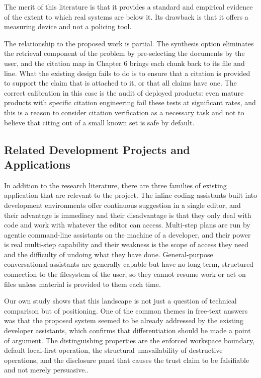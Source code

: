 \documentclass{FastFyp}
\begin{document}
The merit of this literature is that it provides a standard and empirical evidence of the extent to which real systems are below it. Its drawback is that it offers a measuring device and not a policing tool.

The relationship to the proposed work is partial. The synthesis option eliminates the retrieval component of the problem by pre-selecting the documents by the user, and the citation map in Chapter 6 brings each chunk back to its file and line. What the existing design fails to do is to ensure that a citation is provided to support the claim that is attached to it, or that all claims have one. The correct calibration in this case is the audit of deployed products: even mature products with specific citation engineering fail these tests at significant rates, and this is a reason to consider citation verification as a necessary task and not to believe that citing out of a small known set is safe by default.

\subsection{Related Development Projects and Applications}
In addition to the research literature, there are three families of existing application that are relevant to the project. The inline coding assistants built into development environments offer continuous suggestion in a single editor, and their advantage is immediacy and their disadvantage is that they only deal with code and work with whatever the editor can access. Multi-step plans are run by agentic command-line assistants on the machine of a developer, and their power is real multi-step capability and their weakness is the scope of access they need and the difficulty of undoing what they have done. General-purpose conversational assistants are generally capable but have no long-term, structured connection to the filesystem of the user, so they cannot resume work or act on files unless material is provided to them each time.

Our own study shows that this landscape is not just a question of technical comparison but of positioning. One of the common themes in free-text answers was that the proposed system seemed to be already addressed by the existing developer assistants, which confirms that differentiation should be made a point of argument. The distinguishing properties are the enforced workspace boundary, default local-first operation, the structural unavailability of destructive operations, and the disclosure panel that causes the trust claim to be falsifiable and not merely persuasive..
\end{document}
